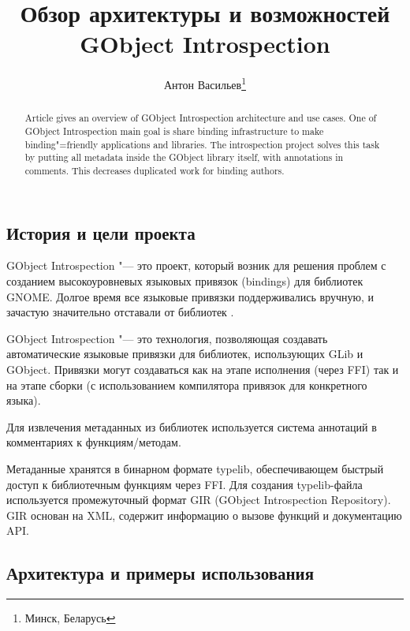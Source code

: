 \documentclass[10pt, a5paper]{article}
\begin{document}
\title{Обзор архитектуры и возможностей GObject Introspection}%

\author{Антон Васильев\footnote{Минск, Беларусь}}
\maketitle

\begin{abstract}
Article gives an overview of GObject Introspection architecture and use cases.
One of GObject Introspection main goal is share binding infrastructure to make binding"=friendly applications and libraries.
The introspection project solves this task by putting all metadata
inside the GObject library itself, with annotations in comments.
This decreases duplicated work for binding authors.
\end{abstract}

\subsection*{История и цели проекта}

GObject Introspection "--- это проект, который возник для решения проблем
с созданием высокоуровневых языковых привязок \linebreak (bindings) для библиотек GNOME. Долгое время все языковые привязки поддерживались вручную, и зачастую значительно отставали от библиотек \cite{Antono1}.

GObject Introspection "--- это технология, позволяющая создавать
автоматические языковые привязки для библиотек, использующих GLib и
GObject.  Привязки могут создаваться как на этапе исполнения (через
FFI) так и на этапе сборки (с использованием компилятора привязок для
конкретного языка).

Для извлечения метаданных из библиотек используется система аннотаций в комментариях к функциям/методам.

Метаданные хранятся в бинарном формате typelib, обеспечивающем
быстрый доступ к библиотечным функциям через FFI. Для создания typelib-файла используется промежуточный формат GIR (GObject Introspection
Repository). GIR основан на XML, содержит информацию о вызове
функций и документацию API.

\subsection*{Архитектура и примеры использования}
\end{document}
